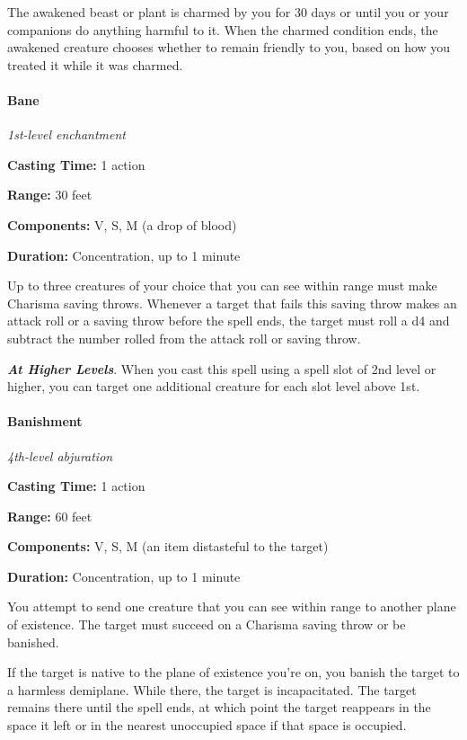 \documentclass[
]{article}
\begin{document}
The awakened beast or plant is charmed by you for 30 days or until you
or your companions do anything harmful to it. When the charmed condition
ends, the awakened creature chooses whether to remain friendly to you,
based on how you treated it while it was charmed.

\hypertarget{bane}{%
\paragraph{Bane}\label{bane}}

\emph{1st-level enchantment}

\textbf{Casting Time:} 1 action

\textbf{Range:} 30 feet

\textbf{Components:} V, S, M (a drop of blood)

\textbf{Duration:} Concentration, up to 1 minute

Up to three creatures of your choice that you can see within range must
make Charisma saving throws. Whenever a target that fails this saving
throw makes an attack roll or a saving throw before the spell ends, the
target must roll a d4 and subtract the number rolled from the attack
roll or saving throw.

\emph{\textbf{At Higher Levels}}. When you cast this spell using a spell
slot of 2nd level or higher, you can target one additional creature for
each slot level above 1st.

\hypertarget{banishment}{%
\paragraph{Banishment}\label{banishment}}

\emph{4th-level abjuration}

\textbf{Casting Time:} 1 action

\textbf{Range:} 60 feet

\textbf{Components:} V, S, M (an item distasteful to the target)

\textbf{Duration:} Concentration, up to 1 minute

You attempt to send one creature that you can see within range to
another plane of existence. The target must succeed on a Charisma saving
throw or be banished.

If the target is native to the plane of existence you're on, you banish
the target to a harmless demiplane. While there, the target is
incapacitated. The target remains there until the spell ends, at which
point the target reappears in the space it left or in the nearest
unoccupied space if that space is occupied.
\end{document}
